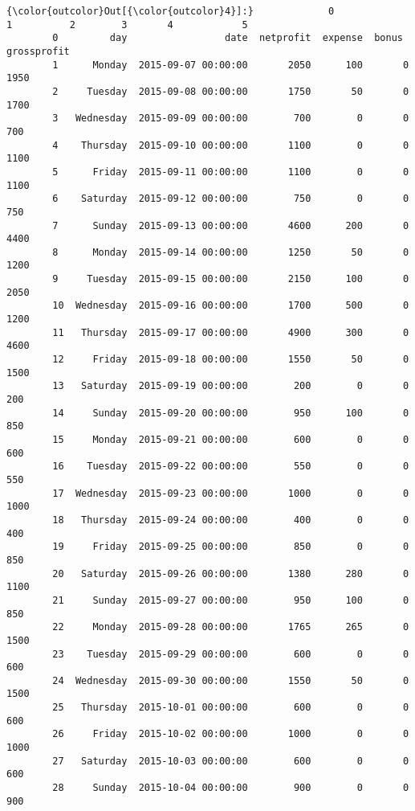 \documentclass[11pt]{article}
\begin{document}
\begin{Verbatim}[commandchars=\\\{\}]
{\color{outcolor}Out[{\color{outcolor}4}]:}             0                    1          2        3       4            5
        0         day                 date  netprofit  expense  bonus   grossprofit
        1      Monday  2015-09-07 00:00:00       2050      100       0         1950
        2     Tuesday  2015-09-08 00:00:00       1750       50       0         1700
        3   Wednesday  2015-09-09 00:00:00        700        0       0          700
        4    Thursday  2015-09-10 00:00:00       1100        0       0         1100
        5      Friday  2015-09-11 00:00:00       1100        0       0         1100
        6    Saturday  2015-09-12 00:00:00        750        0       0          750
        7      Sunday  2015-09-13 00:00:00       4600      200       0         4400
        8      Monday  2015-09-14 00:00:00       1250       50       0         1200
        9     Tuesday  2015-09-15 00:00:00       2150      100       0         2050
        10  Wednesday  2015-09-16 00:00:00       1700      500       0         1200
        11   Thursday  2015-09-17 00:00:00       4900      300       0         4600
        12     Friday  2015-09-18 00:00:00       1550       50       0         1500
        13   Saturday  2015-09-19 00:00:00        200        0       0          200
        14     Sunday  2015-09-20 00:00:00        950      100       0          850
        15     Monday  2015-09-21 00:00:00        600        0       0          600
        16    Tuesday  2015-09-22 00:00:00        550        0       0          550
        17  Wednesday  2015-09-23 00:00:00       1000        0       0         1000
        18   Thursday  2015-09-24 00:00:00        400        0       0          400
        19     Friday  2015-09-25 00:00:00        850        0       0          850
        20   Saturday  2015-09-26 00:00:00       1380      280       0         1100
        21     Sunday  2015-09-27 00:00:00        950      100       0          850
        22     Monday  2015-09-28 00:00:00       1765      265       0         1500
        23    Tuesday  2015-09-29 00:00:00        600        0       0          600
        24  Wednesday  2015-09-30 00:00:00       1550       50       0         1500
        25   Thursday  2015-10-01 00:00:00        600        0       0          600
        26     Friday  2015-10-02 00:00:00       1000        0       0         1000
        27   Saturday  2015-10-03 00:00:00        600        0       0          600
        28     Sunday  2015-10-04 00:00:00        900        0       0          900

\end{Verbatim}
\end{document}
